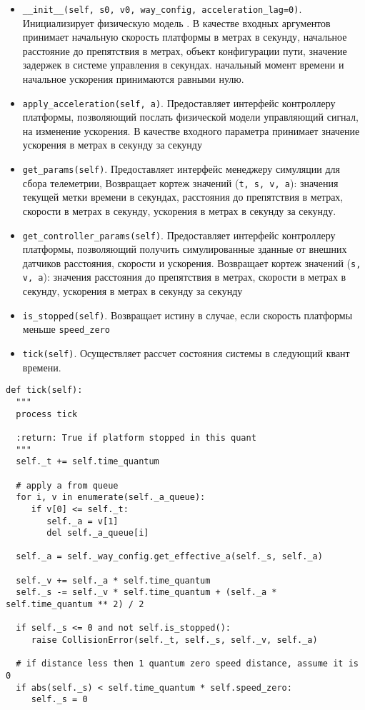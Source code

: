 \begin{itemize}
	\item  \lstinline!__init__(self, s0, v0, way_config, acceleration_lag=0)!. Инициализирует физическую модель . В качестве входных аргументов принимает начальную скорость платформы в метрах в секунду, начальное расстояние до препятствия в метрах, объект конфигурации пути, значение задержек в системе управления в секундах. начальный момент времени и начальное ускорения принимаются равными нулю.
	\item  \lstinline!apply_acceleration(self, a)!. Предоставляет интерфейс контроллеру платформы, позволяющий послать физической модели управляющий сигнал, на изменение ускорения. В качестве входного параметра принимает значение ускорения в метрах в секунду за секунду
	\item  \lstinline!get_params(self)!. Предоставляет интерфейс менеджеру симуляции для сбора телеметрии, Возвращает кортеж значений (\lstinline!t, s, v, a!): значения текущей метки времени в секундах, расстояния до препятствия в метрах, скорости в метрах в секунду, ускорения в метрах в секунду за секунду.
	\item  \lstinline!get_controller_params(self)!. Предоставляет интерфейс контроллеру платформы, позволяющий получить симулированные зданные от внешних датчиков расстояния, скорости и ускорения. Возвращает кортеж значений (\lstinline!s, v, a!): значения расстояния до препятствия в метрах, скорости в метрах в секунду, ускорения в метрах в секунду за секунду
	\item  \lstinline!is_stopped(self)!. Возвращает истину в случае, если скорость платформы меньше \lstinline!speed_zero!
	\item  \lstinline!tick(self)!.  Осуществляет рассчет состояния системы в следующий квант времени.
\end{itemize}



\begin{lstlisting}[style=pythonstyle,caption={  }, label=lst:func:1]
def tick(self):
  """
  process tick

  :return: True if platform stopped in this quant
  """
  self._t += self.time_quantum

  # apply a from queue
  for i, v in enumerate(self._a_queue):
     if v[0] <= self._t:
        self._a = v[1]
        del self._a_queue[i]

  self._a = self._way_config.get_effective_a(self._s, self._a)

  self._v += self._a * self.time_quantum
  self._s -= self._v * self.time_quantum + (self._a * self.time_quantum ** 2) / 2

  if self._s <= 0 and not self.is_stopped():
     raise CollisionError(self._t, self._s, self._v, self._a)

  # if distance less then 1 quantum zero speed distance, assume it is 0
  if abs(self._s) < self.time_quantum * self.speed_zero:
     self._s = 0
\end{lstlisting}


